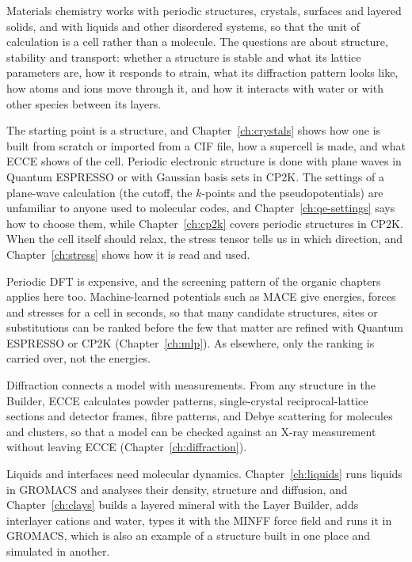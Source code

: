 
Materials chemistry works with periodic structures, crystals, surfaces and layered solids, and with liquids and other disordered systems, so that the unit of calculation is a cell rather than a molecule. The questions are about structure, stability and transport: whether a structure is stable and what its lattice parameters are, how it responds to strain, what its diffraction pattern looks like, how atoms and ions move through it, and how it interacts with water or with other species between its layers.

The starting point is a structure, and Chapter~\ref{ch:crystals} shows how one is built from scratch or imported from a CIF file, how a supercell is made, and what ECCE shows of the cell. Periodic electronic structure is done with plane waves in Quantum ESPRESSO or with Gaussian basis sets in CP2K. The settings of a plane-wave calculation (the cutoff, the $k$-points and the pseudopotentials) are unfamiliar to anyone used to molecular codes, and Chapter~\ref{ch:qe-settings} says how to choose them, while Chapter~\ref{ch:cp2k} covers periodic structures in CP2K. When the cell itself should relax, the stress tensor tells us in which direction, and Chapter~\ref{ch:stress} shows how it is read and used.

Periodic DFT is expensive, and the screening pattern of the organic chapters applies here too. Machine-learned potentials such as MACE give energies, forces and stresses for a cell in seconds, so that many candidate structures, sites or substitutions can be ranked before the few that matter are refined with Quantum ESPRESSO or CP2K (Chapter~\ref{ch:mlp}). As elsewhere, only the ranking is carried over, not the energies.

Diffraction connects a model with measurements. From any structure in the Builder, ECCE calculates powder patterns, single-crystal reciprocal-lattice sections and detector frames, fibre patterns, and Debye scattering for molecules and clusters, so that a model can be checked against an X-ray measurement without leaving ECCE (Chapter~\ref{ch:diffraction}).

Liquids and interfaces need molecular dynamics. Chapter~\ref{ch:liquids} runs liquids in GROMACS and analyses their density, structure and diffusion, and Chapter~\ref{ch:clays} builds a layered mineral with the Layer Builder, adds interlayer cations and water, types it with the MINFF force field and runs it in GROMACS, which is also an example of a structure built in one place and simulated in another.
